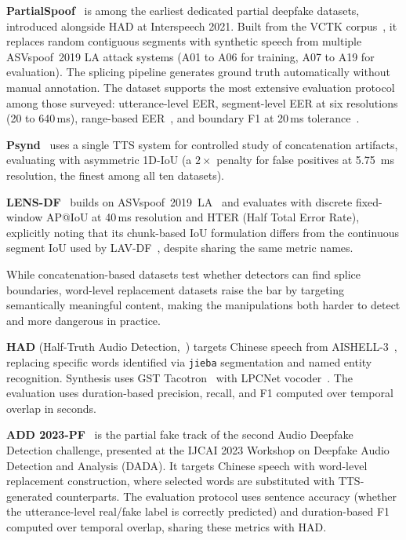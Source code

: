 \documentclass[journal]{IEEEtran}
\begin{document}
\textbf{PartialSpoof}~\cite{zhang2021initialinvestigation,zhang2023partialspoof} is among the earliest dedicated partial deepfake datasets, introduced alongside HAD at Interspeech 2021. Built from the VCTK corpus~\cite{veaux2016vctk}, it replaces random contiguous segments with synthetic speech from multiple ASVspoof~2019 LA attack systems (A01 to A06 for training, A07 to A19 for evaluation). The splicing pipeline generates ground truth automatically without manual annotation. The dataset supports the most extensive evaluation protocol among those surveyed: utterance-level EER, segment-level EER at six resolutions (20 to 640\,ms), range-based EER~\cite{zhang2023rangeeer}, and boundary F1 at 20\,ms tolerance~\cite{zhang2023partialspoof}.

\textbf{Psynd}~\cite{zhang2022localizing} uses a single TTS system for controlled study of concatenation artifacts, evaluating with asymmetric 1D-IoU (a $2\times$ penalty for false positives at 5.75~ms resolution, the finest among all ten datasets).

\textbf{LENS-DF}~\cite{liu2025lensdf} builds on ASVspoof~2019~LA~\cite{wang2020asvspoof2019} and evaluates with discrete fixed-window AP@IoU at 40\,ms resolution and HTER (Half Total Error Rate), explicitly noting that its chunk-based IoU formulation differs from the continuous segment IoU used by LAV-DF~\cite{cai2022lavdf}, despite sharing the same metric names.

While concatenation-based datasets test whether detectors can find splice boundaries, word-level replacement datasets raise the bar by targeting semantically meaningful content, making the manipulations both harder to detect and more dangerous in practice.

\textbf{HAD} (Half-Truth Audio Detection,~\cite{yi2021had}) targets Chinese speech from AISHELL-3~\cite{shi2021aishell3}, replacing specific words identified via \texttt{jieba} segmentation and named entity recognition. Synthesis uses GST Tacotron~\cite{wang2018gst} with LPCNet vocoder~\cite{valin2019lpcnet}. The evaluation uses duration-based precision, recall, and F1 computed over temporal overlap in seconds.

\textbf{ADD 2023-PF}~\cite{yi2023add} is the partial fake track of the second Audio Deepfake Detection challenge, presented at the IJCAI 2023 Workshop on Deepfake Audio Detection and Analysis (DADA). It targets Chinese speech with word-level replacement construction, where selected words are substituted with TTS-generated counterparts. The evaluation protocol uses sentence accuracy (whether the utterance-level real/fake label is correctly predicted) and duration-based F1 computed over temporal overlap, sharing these metrics with HAD.
\end{document}
